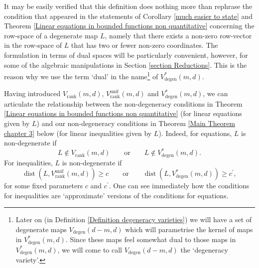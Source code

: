 \documentclass[12pt,a4paper,twoside,reqno]{amsart}
\newcommand{\degen}{\operatorname{degen}}
\newcommand{\rank}{\operatorname{rank}}
\newcommand{\dist}{\operatorname{dist}}
\newcommand{\unif}{\operatorname{unif}}
\numberwithin{equation}{section}
\begin{document}
\noindent It may be easily verified that this definition does nothing more than rephrase the condition that appeared in the statements of Corollary \ref{much easier to state} and Theorem \ref{Linear equations in bounded functions non quantitative} concerning the row-space of a degenerate map $L$, namely that there exists a non-zero row-vector in the row-space of $L$ that has two or fewer non-zero coordinates. The formulation in terms of dual spaces will be particularly convenient, however, for some of the algebraic manipulations in Section \ref{section Reductions}. This is the reason why we use the term `dual' in the name\footnote{Later on (in Definition \ref{Definition degeneracy varieties}) we will have a set  of degenerate maps $V_{\degen}(d-m,d)$ which will parametrise the kernel of maps in $V_{\degen}^*(m,d)$. Since these maps feel somewhat dual to those maps in $V_{\degen}^*(m,d)$, we will come to call $V_{\degen}(d-m,d)$ the `degeneracy variety'.} of $V_{\degen}^*(m,d)$. 



Having introduced $V_{\rank}(m,d)$, $V_{\rank}^{\unif}(m,d)$ and $V_{\degen}^*(m,d)$, we can articulate the relationship between the non-degeneracy conditions in Theorem \ref{Linear equations in bounded functions non quantitative} (for linear equations given by $L$) and our non-degeneracy conditions in Theorem \ref{Main Theorem chapter 3} below (for linear inequalities given by $L$). Indeed, for equations, $L$ is non-degenerate if \begin{equation}
\label{conditions for equations}
L \notin V_{\rank}(m,d) \qquad \text{or} \qquad L \notin V_{\degen}^*(m,d).
\end{equation} For inequalities,  $L$ is non-degenerate if
\begin{equation}
\label{conditions for inequalities}
\dist(L, V_{\rank}^{\unif}(m,d)) \geqslant c \qquad \text{or} \qquad \dist(L,V_{\degen}^*(m,d)) \geqslant c^\prime,
\end{equation} for some fixed parameters $c$ and $c^\prime$. One can see immediately how the conditions for inequalities are `approximate' versions of the conditions for equations. \\
\end{document}

